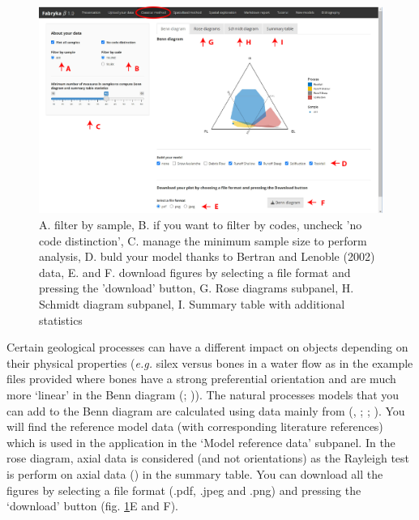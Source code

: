 \documentclass[
]{article}
\begin{document}
\begin{figure} [H]
\centering
  \includegraphics[width=16cm]{figure/classical_method.jpg}
  \caption{A. filter by sample, B. if you want to filter by codes, uncheck 'no code distinction', C. manage the minimum sample size to perform analysis, D. buld your model thanks to Bertran and Lenoble (2002) data, E. and F. download figures by selecting a file format and pressing the 'download' button, G. Rose diagrams subpanel, H. Schmidt diagram subpanel, I. Summary table with additional statistics}
\label{fig:figure_classical_method}
\end{figure}

Certain geological processes can have a different impact on objects
depending on their physical properties (\emph{e.g.} silex versus bones
in a water flow as in the example files provided where bones have a
strong preferential orientation and are much more `linear' in the Benn
diagram (;
)). The natural processes
models that you can add to the Benn diagram are calculated using data
mainly from (,
; ; ).
You will find the reference model data (with corresponding literature
references) which is used in the application in the `Model reference
data' subpanel. In the rose diagram, axial data is considered (and not
orientations) as the Rayleigh test is perform on axial data
() in the summary table. You can
download all the figures by selecting a file format (.pdf, .jpeg and
.png) and pressing the `download' button (fig.
\ref{fig:figure_classical_method}E and F).
\end{document}
